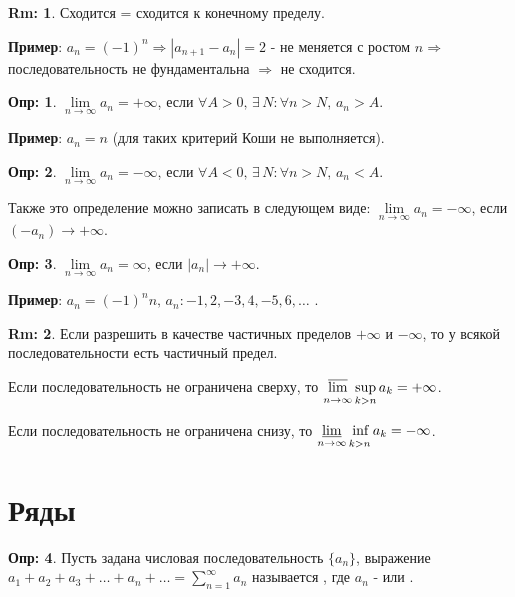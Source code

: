 \documentclass[12pt]{article}
\theoremstyle{definition}
\newtheorem{defn}{Опр:}
\newtheorem{rem}{Rm:}
\begin{document}
\begin{rem}
	Сходится = сходится к конечному пределу.
\end{rem}

\textbf{Пример}: $a_n = (-1)^n \Rightarrow |a_{n+1} - a_n| = 2$ - не меняется с ростом $n \Rightarrow$ последовательность не фундаментальна $\Rightarrow$ не сходится.

\begin{defn}
	$\lim\limits_{n \to \infty} a_n = +\infty$, если $\forall A > 0, \, \exists \, N \colon \forall n > N, \, a_n > A$. 
\end{defn}

\textbf{Пример}: $a_n = n$ (для таких критерий Коши не выполняется).

\begin{defn}
	$\lim\limits_{n \to \infty} a_n = -\infty$, если $\forall A < 0, \, \exists \, N \colon \forall n > N, \, a_n < A$. 
\end{defn}

Также это определение можно записать в следующем виде: $\lim\limits_{n \to \infty} a_n = -\infty$, если $(-a_n) \to +\infty$. 

\begin{defn}
	$\lim\limits_{n \to \infty} a_n = \infty$, если $|a_n| \to +\infty$.
\end{defn}
	
\textbf{Пример}: $a_n = (-1)^nn, \, a_n \colon -1, 2, -3, 4, -5, 6, \dotsc$ .

\begin{rem}
	Если разрешить в качестве частичных пределов $+\infty$ и $-\infty$, то у всякой последовательности есть частичный предел.
\end{rem}

Если последовательность не ограничена сверху, то $\underset{n \to \infty}{\vphantom{\sup}\overline{\lim}}\, \underset{k > n}{\sup}\,a_k = +\infty$.

Если последовательность не ограничена снизу, то $\underset{n \to \infty}{\underline{\lim}}\, \underset{k > n}{\vphantom{\underline{\lim}}\inf}\, a_k  = -\infty$.

\newpage
\section*{Ряды}

\begin{defn}
	Пусть задана числовая последовательность $\{a_n\}$, выражение $a_1 + a_2 + a_3 + \dotsc + a_n + \dotsc = \displaystyle \sum\limits_{n = 1}^{\infty}a_n$ называется , где $a_n$ -  или .
\end{defn}
\end{document}
